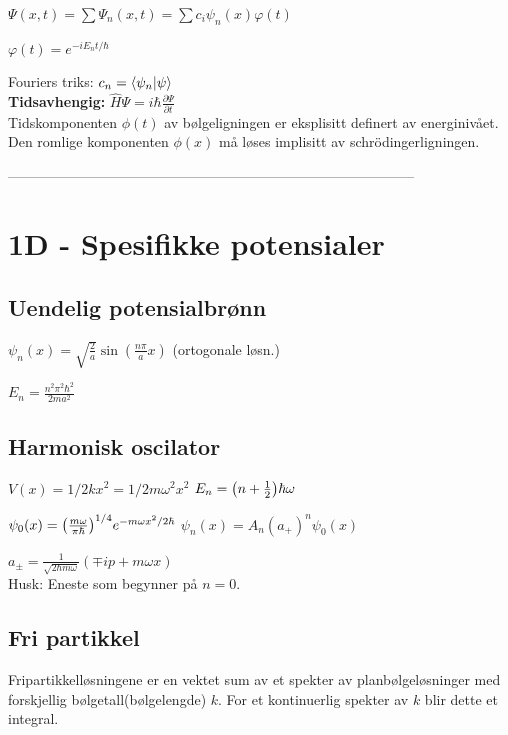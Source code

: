 \documentclass[10p,a4paper]{extarticle}
\newcommand{\pptw}{\frac{\partial \Psi}{\partial t}}
\renewcommand{\exp}{e^}
\newcommand{\half}{\frac{1}{2}}
\begin{document}
\begin{multicols}{2}
$\Psi(x,t) = \sum \Psi_n(x,t) = \sum c_i \psi_n(x)\varphi(t)$

$\varphi(t) = \exp{-iE_nt/\hbar}$

Fouriers triks: $c_n = \bra{\psi_n}\ket{\psi}$
\\

\textbf{Tidsavhengig:} $\hat{H}\Psi = i\hbar\pptw$
\\

Tidskomponenten $\phi(t)$ av bølgeligningen er eksplisitt definert av energinivået. Den romlige komponenten $\phi(x)$ må løses implisitt av schrödingerligningen.


---------------------------------------------------------------------------------------


\section*{1D - Spesifikke potensialer}

\subsection*{Uendelig potensialbrønn}
$\psi_n(x) = \sqrt{\frac{2}{a}}\sin(\frac{n\pi}{a}x)$ \quad\quad (ortogonale løsn.)

$E_n = \frac{n^2\pi^2\hbar^2}{2ma^2}$


\subsection*{Harmonisk oscilator}
$V(x) = 1/2kx^2 = 1/2m\omega^2x^2$ \hspace{1cm} $E_n = \qty(n+\half)\hbar\omega$

$\psi_0(x) = \qty(\frac{m\omega}{\pi\hbar})^{1/4}\exp{-m\omega x^2 / 2\hbar}$ \hspace{1cm} $\psi_n(x) = A_n (a_+)^n \psi_0(x)$

$a_{\pm} = \frac{1}{\sqrt{2\hbar m \omega}}(\mp ip + m\omega x)$
\\

Husk: Eneste som begynner på $n=0$.

\columnbreak

\subsection*{Fri partikkel}
Fripartikkelløsningene er en vektet sum av et spekter av planbølgeløsninger med forskjellig bølgetall(bølgelengde) $k$. For et kontinuerlig spekter av $k$ blir dette et integral.


\end{multicols}
\end{document}
